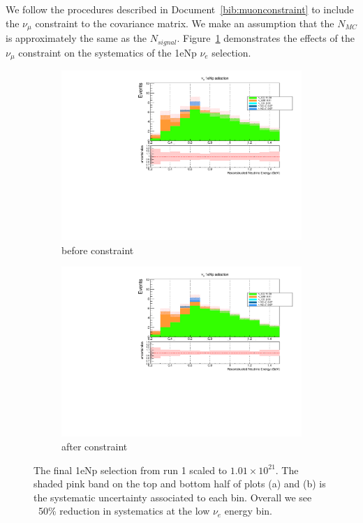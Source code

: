 \documentclass[a4paper]{article}
\begin{document}
\par We follow the procedures described in Document~\ref{bib:muonconstraint} to include the $\nu_\mu$ constraint to the covariance matrix. We make an assumption that the $N_{MC}$ is approximately the same as the $N_{signal}$.
Figure~\ref{fig:numuconstraintresult} demonstrates the effects of the $\nu_\mu$ constraint on the systematics of the 1eNp $\nu_e$ selection. 

\begin{figure}[ht] 
\begin{center}
    \begin{subfigure}[b]{0.45\textwidth}
    \centering
    \includegraphics[width=1.00\textwidth]{Sensitivity/numuconstraint/nuenumu_reco_e1_before_constraint.pdf}
    \caption{before constraint}
    \end{subfigure}
    \begin{subfigure}[b]{0.45\textwidth}
    \centering
    \includegraphics[width=1.00\textwidth]{Sensitivity/numuconstraint/nuenumu_reco_e1_after_constraint.pdf}
    \caption{after constraint}
    \end{subfigure}
\caption{\label{fig:numuconstraintresult} The final 1eNp selection from run 1 scaled to $1.01\times10^{21}$. The shaded pink band on the top and bottom half of plots (a) and (b) is the systematic uncertainty associated to each bin. Overall we see ~50\% reduction in systematics at the low $\nu_e$ energy bin.}
\end{center}
\end{figure}
\end{document}
